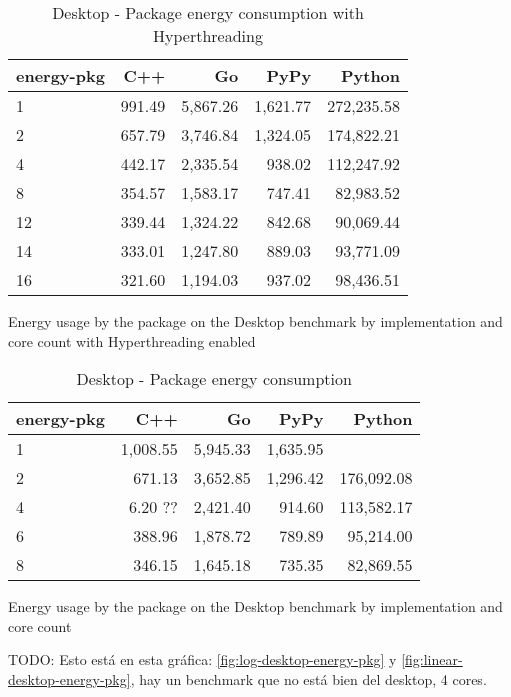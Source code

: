 \begin{table}[H]
 \centering
    \begin{tabular}{lrrrr}
    \hline
    energy-pkg & C++ & Go & PyPy & Python \\
    \hline
    1 & 991.49 & 5,867.26 & 1,621.77 & 272,235.58 \\
    2 & 657.79 & 3,746.84 & 1,324.05 & 174,822.21 \\
    4 & 442.17 & 2,335.54 & 938.02 & 112,247.92 \\
    8 & 354.57 & 1,583.17 & 747.41 & 82,983.52 \\
    12 & 339.44 & 1,324.22 & 842.68 & 90,069.44 \\
    14 & 333.01 & 1,247.80 & 889.03 & 93,771.09 \\
    16 & 321.60 & 1,194.03 & 937.02 & 98,436.51 \\
    \hline
    \end{tabular}
\caption{Desktop - Package energy consumption with Hyperthreading}{Energy usage by the package on the Desktop benchmark by implementation and core count with Hyperthreading enabled}
\label{tab:desktop-energy-pkg-hyperthreading}
\end{table}

\begin{table}[H]
    \centering
    \begin{tabular}{lrrrr}
        \hline
        energy-pkg     & C++                 & Go          & PyPy       & Python              \\
        \hline
        1              & 1,008.55            & 5,945.33    & 1,635.95   &                    \\
        2              & 671.13              & 3,652.85    & 1,296.42   & 176,092.08         \\
        4              & 6.20 ??             & 2,421.40    & 914.60     & 113,582.17         \\
        6              & 388.96              & 1,878.72    & 789.89     & 95,214.00          \\
        8	           & 346.15              & 1,645.18    & 735.35     & 82,869.55          \\
        \hline
    \end{tabular}
\caption{Desktop - Package energy consumption}{Energy usage by the package on the Desktop benchmark by implementation and core count}
\label{tab:desktop-energy-pkg}
\end{table}

TODO:
Esto está en esta gráfica: \autoref{fig:log-desktop-energy-pkg} y \autoref{fig:linear-desktop-energy-pkg}, hay un benchmark que no está bien del desktop, 4 cores.

